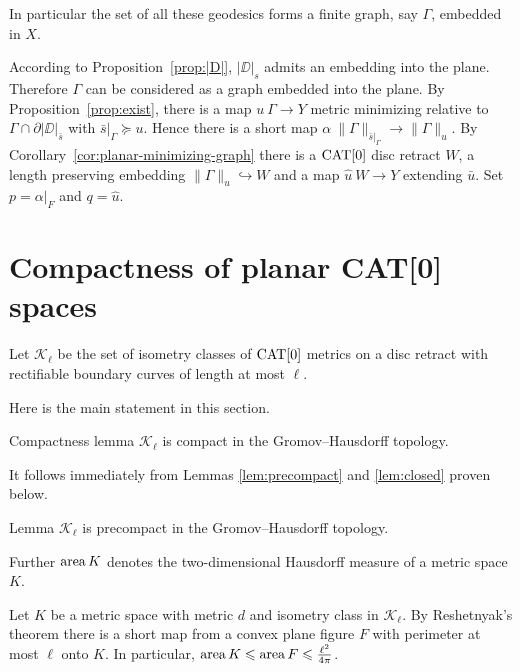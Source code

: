 \documentclass{article}
\begin{document}

In particular the set of all these geodesics forms a finite graph, say $\Gamma$,
embedded in $X$. 

According to Proposition~\ref{prop:|D|},
$|\DD|_s$ admits an embedding into the plane.
Therefore $\Gamma$ can be considered as a graph embedded into the plane.
By Proposition~\ref{prop:exist}, there is a map $u\:\Gamma\to Y$ metric minimizing relative to $\Gamma\cap\partial|\DD|_{\bar s}$ with
$\bar s|_\Gamma\succcurlyeq u$.
Hence there is a short map $\alpha\:\|\Gamma\|_{\bar s|_\Gamma}\to\|\Gamma\|_u$. 
By Corollary~\ref{cor:planar-minimizing-graph} there is a $\mathop{\rm CAT}\nolimits[0]$ disc retract $W$, a length preserving embedding
$\|\Gamma\|_u\hookrightarrow W$ and a map $\hat u\:W\to Y$ extending $\bar u$. %
Set $p=\alpha|_F$ and $q=\hat u$.
\qeds

\section{Compactness of planar CAT[0] spaces}\label{Compactness}

Let $\mathcal{K}_\ell$ be the set of isometry classes of $\mathop{\rm CAT}\nolimits[0]$ metrics on a disc retract with rectifiable
boundary curves of length at most $\ell$.


Here is the main statement in this section.

\begin{thm}{Compactness lemma}\label{lem:compact}
$\mathcal{K}_\ell$ is compact in the Gromov--Hausdorff topology.
\end{thm}

It follows immediately from Lemmas \ref{lem:precompact} and \ref{lem:closed} proven below.

\begin{thm}{Lemma}\label{lem:precompact}
$\mathcal{K}_\ell$ is precompact in the Gromov--Hausdorff topology.
\end{thm}

Further $\mathop{\rm area}\nolimits K$ denotes the two-dimensional Hausdorff measure of a metric space $K$. 

Let $K$ be a metric space with metric $d$ and isometry class in $\mathcal {K}_\ell$.
By Reshetnyak's theorem there is a short map from a convex plane figure $F$ with perimeter at most $\ell$ onto $K$.
In particular, $\mathop{\rm area}\nolimits K \leqslant \mathop{\rm area}\nolimits F \leqslant \tfrac{\ell^2}{4\pi}$.
\end{document}
